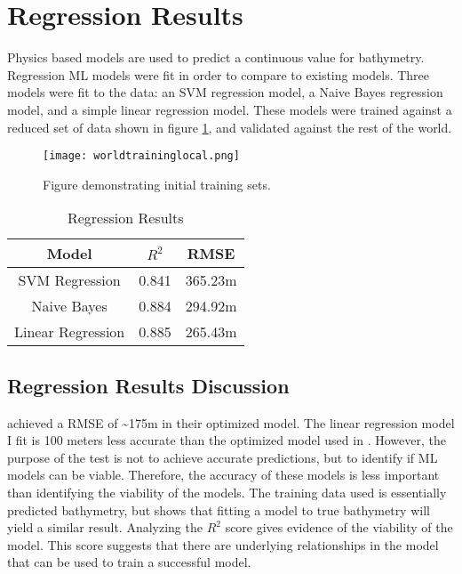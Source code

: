 \section{Regression Results}
Physics based models are used to predict a continuous value for bathymetry.
Regression \ac{ML} models were fit in order to compare to existing models.
Three models were fit to the data: 
an SVM regression model, a Naive Bayes regression model, and a simple linear regression model.
These models were trained against a reduced set of data shown in figure \ref{fig:trainset}, and validated against the rest of the world.

\begin{figure}[h]
    \centering
    \texttt{[image: worldtraininglocal.png]}
    \caption{Figure demonstrating initial training sets.}
    \label{fig:trainset}
\end{figure}

\begin{table}[htp]
    \centering
    \begin{tabular}{|c c c|}
        \hline
		\textbf{Model} & \textbf{\(R^2\)} & \textbf{RMSE} \\
		\hline
		SVM Regression & 0.841 & 365.23m \\
		Naive Bayes & 0.884 & 294.92m \\
        Linear Regression & 0.885 & 265.43m \\
	    \hline
    \end{tabular}
    \label{table:REGRESSION_RESULTS}
    \caption{Regression Results}
\end{table}

\subsection{Regression Results Discussion}
\cite{jena2012prediction} achieved a \ac{RMSE} of \~{}175m in their optimized model.
The linear regression model I fit is 100 meters less accurate than the optimized model used in \cite{jena2012prediction}.
However, the purpose of the test is not to achieve accurate predictions, but to identify if \ac{ML} models can be viable.
Therefore, the accuracy of these models is less important than identifying the viability of the models.
The training data used is essentially predicted bathymetry, but shows that fitting a model to true bathymetry will yield a similar result.
Analyzing the \(R^2\) score gives evidence of the viability of the model.
This score suggests that there are underlying relationships in the model that can be used to train a successful model.


